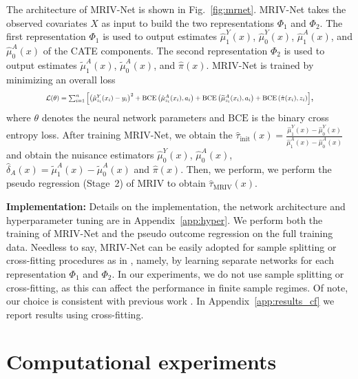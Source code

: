 \documentclass{article} %
\newcommand{\frameworkname}{MRIV\xspace}
\newcommand{\modelname}{\mbox{MRIV-Net}\xspace}
\theoremstyle{definition}
\theoremstyle{plain}
\begin{document}
The architecture of \modelname is shown in Fig.~\ref{fig:mrnet}. \modelname takes the observed covariates $X$ as input to build the two representations $\Phi_1$ and $\Phi_2$. The first representation $\Phi_1$ is used to output estimates $\hat{\mu}_1^Y(x)$, $\hat{\mu}_0^Y(x)$, $\hat{\mu}_1^A(x)$, and $\hat{\mu}_0^A(x)$ of the CATE components. The second representation $\Phi_2$ is used to output estimates $\widetilde{\mu}_1^A(x)$, $\widetilde{\mu}_0^A(x)$, and $\hat{\pi}(x)$. \modelname is trained by minimizing an overall loss
\begin{equation}
    \resizebox{.8\hsize}{!}{$\mathcal{L}(\theta) = \sum_{i=1}^n \left[ \left(\hat{\mu}_{z_i}^Y(x_i) - y_i \right)^2 + \mathrm{BCE}\left(\hat{\mu}_{z_i}^A(x_i), a_i \right) + \mathrm{BCE}\left(\widetilde{\mu}_{z_i}^A(x_i), a_i \right) +  \mathrm{BCE}\left(\hat{\pi}(x_i), z_i \right) \right]$},
\end{equation}
where $\theta$ denotes the neural network parameters and $\mathrm{BCE}$ is the binary cross entropy loss. After training \modelname, we obtain the $\hat{\tau}_{\mathrm{init}}(x) = \frac{\hat{\mu}_1^Y(x) - \hat{\mu}_0^Y(x)}{\hat{\mu}_1^A(x) - \hat{\mu}_0^A(x)}$ and obtain the nuisance estimators $\hat{\mu}_0^Y(x)$, $\hat{\mu}_0^A(x)$, $\hat{\delta}_A(x) = \widetilde{\mu}_1^A(x) - \widetilde{\mu}_0^A(x)$ and $\hat{\pi}(x)$. Then, we perform, we perform the pseudo regression (Stage~2) of \frameworkname to obtain $\hat{\tau}_{\mathrm{\frameworkname}}(x)$.


\textbf{Implementation:} %
Details on the implementation, the network architecture and hyperparameter tuning are in Appendix~\ref*{app:hyper}. We perform both the training of \modelname and the pseudo outcome regression on the full training data. Needless to say, \modelname can be easily adopted for sample splitting or cross-fitting procedures as in \citet{Chernozhukov.2018}, namely, by learning separate networks for each representation $\Phi_1$ and $\Phi_2$. In our experiments, we do not use sample splitting or cross-fitting, as this can affect the performance in finite sample regimes. Of note, our choice is consistent with previous work \citep{Curth.2021}. In Appendix~\ref{app:results_cf} we report results using cross-fitting.


\section{Computational experiments}
\label{sec:experiments}
\end{document}
